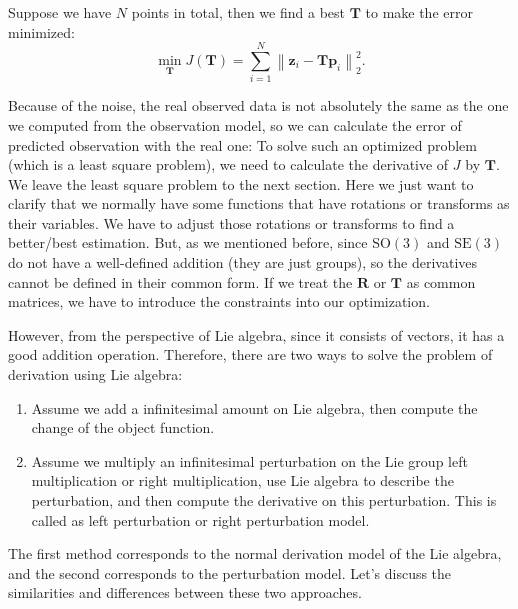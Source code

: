 Suppose we have $N$ points in total, then we find a best $\mathbf{T}$ to make the error minimized: 
\begin{equation}
\mathop {\min }\limits_{\mathbf{T}} J(\mathbf{T} ) = \sum_{i=1}^{N} \left\| {\mathbf{z}_i - \mathbf{Tp}_i} \right\|^2_2.
\end{equation}

Because of the noise, the real observed data is not absolutely the same as the one we computed from the observation model, so we can calculate the error of predicted observation with the real one: 
To solve such an optimized problem (which is a least square problem), we need to calculate the derivative of $J$ by $\mathbf{T}$. We leave the least square problem to the next section. Here we just want to clarify that we normally have some functions that have rotations or transforms as their variables. We have to adjust those rotations or transforms to find a better/best estimation. But, as we mentioned before, since $\mathrm{SO}(3)$ and $\mathrm{SE}(3)$ do not have a well-defined addition (they are just groups), so the derivatives cannot be defined in their common form. If we treat the $\mathbf{R}$ or $\mathbf{T}$ as common matrices, we have to introduce the constraints into our optimization. 

However, from the perspective of Lie algebra, since it consists of vectors, it has a good addition operation. Therefore, there are two ways to solve the problem of derivation using Lie algebra:

\begin{enumerate}
    \item Assume we add a infinitesimal amount on Lie algebra, then compute the change of the object function.
    \item Assume we multiply an infinitesimal perturbation on the Lie group left multiplication or right multiplication, use Lie algebra to describe the perturbation, and then compute the derivative on this perturbation. This is called as left perturbation or right perturbation model.
\end{enumerate}

The first method corresponds to the normal derivation model of the Lie algebra, and the second corresponds to the perturbation model. Let's discuss the similarities and differences between these two approaches.

